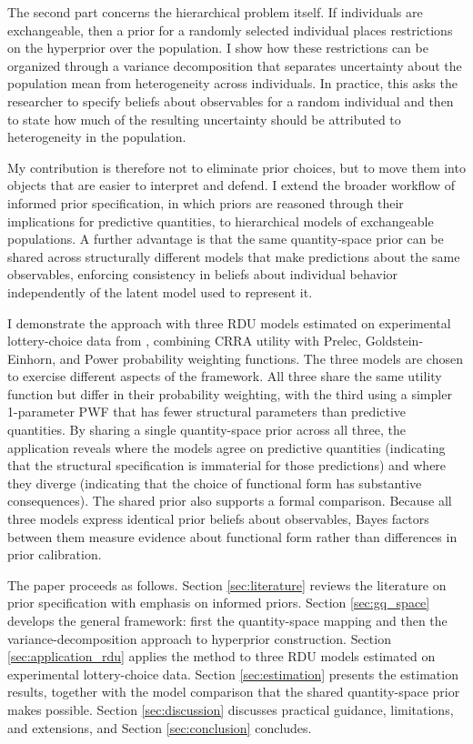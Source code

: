 \documentclass[12pt,a4paper]{article}
\theoremstyle{definition}
\theoremstyle{remark}
\begin{document}
The second part concerns the hierarchical problem itself. If individuals are
exchangeable, then a prior for a randomly selected individual places
restrictions on the hyperprior over the population. I show how these
restrictions can be organized through a variance decomposition that separates
uncertainty about the population mean from heterogeneity across individuals. In
practice, this asks the researcher to specify beliefs about observables for a
random individual and then to state how much of the resulting uncertainty should
be attributed to heterogeneity in the population.

My contribution is therefore not to eliminate prior choices, but to move them
into objects that are easier to interpret and defend. I extend the broader
workflow of informed prior specification, in which priors are reasoned through
their implications for predictive quantities, to hierarchical models of
exchangeable populations. A further advantage is that the same quantity-space
prior can be shared across structurally different models that make predictions
about the same observables, enforcing consistency in beliefs about individual
behavior independently of the latent model used to represent it.

I demonstrate the approach with three RDU models estimated on experimental
lottery-choice data from \textcite{Harrison2016}, combining CRRA utility
with Prelec, Goldstein-Einhorn, and Power probability weighting functions.
The three models are chosen to exercise different aspects of the framework.
All three share the same utility function but differ in their probability
weighting, with the third using a simpler 1-parameter PWF that has fewer
structural parameters than predictive quantities. By sharing a single quantity-space prior
across all three, the application reveals where the models agree on
predictive quantities (indicating that the structural specification is
immaterial for those predictions) and where they diverge (indicating that
the choice of functional form has substantive consequences). The shared
prior also supports a formal comparison. Because all three models express
identical prior beliefs about observables, Bayes factors between them
measure evidence about functional form rather than differences in prior
calibration.

The paper proceeds as follows. Section \ref{sec:literature} reviews the
literature on prior specification with emphasis on informed priors. Section
\ref{sec:gq_space} develops the general framework: first the quantity-space
mapping and then the variance-decomposition approach to hyperprior
construction. Section \ref{sec:application_rdu} applies the method to three
RDU models estimated on experimental lottery-choice data. Section
\ref{sec:estimation} presents the estimation results, together with the
model comparison that the shared quantity-space prior makes possible.
Section \ref{sec:discussion} discusses practical guidance, limitations, and
extensions, and Section \ref{sec:conclusion} concludes.
\end{document}
